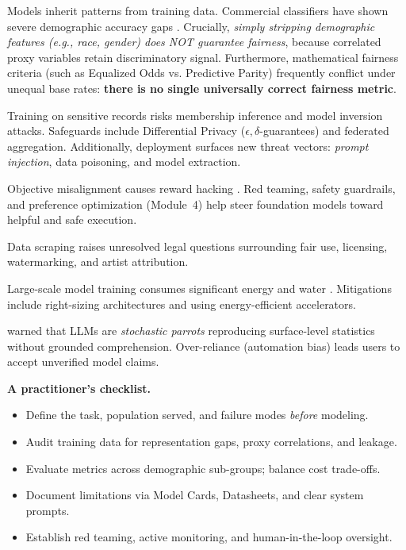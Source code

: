 \documentclass[11pt,a4paper]{article}
\begin{document}
	\begin{ethicsbox}
		\begin{description}[font=\sffamily\bfseries]
			\item[Bias \& Fairness.] Models inherit patterns from training data. Commercial classifiers have shown severe demographic accuracy gaps \parencite{buolamwini2018}. Crucially, \emph{simply stripping demographic features (e.g., race, gender) does NOT guarantee fairness}, because correlated proxy variables retain discriminatory signal. Furthermore, mathematical fairness criteria (such as Equalized Odds vs. Predictive Parity) frequently conflict under unequal base rates: \textbf{there is no single universally correct fairness metric}.
			\item[Privacy \& Security.] Training on sensitive records risks membership inference and model inversion attacks. Safeguards include Differential Privacy ($\epsilon, \delta$-guarantees) and federated aggregation. Additionally, deployment surfaces new threat vectors: \emph{prompt injection}, data poisoning, and model extraction.
			\item[Alignment \& Harm Mitigation.] Objective misalignment causes reward hacking \parencite{amodei2016, christian2020}. Red teaming, safety guardrails, and preference optimization (Module~4) help steer foundation models toward helpful and safe execution.
			\item[Copyright \& Provenance.] Data scraping raises unresolved legal questions surrounding fair use, licensing, watermarking, and artist attribution.
			\item[Environment.] Large-scale model training consumes significant energy and water \parencite{strubell2019, patterson2021}. Mitigations include right-sizing architectures and using energy-efficient accelerators.
			\item[Automation Bias \& Grounding.] \textcite{bender2021} warned that LLMs are \emph{stochastic parrots} reproducing surface-level statistics without grounded comprehension. Over-reliance (automation bias) leads users to accept unverified model claims.
		\end{description}
	\end{ethicsbox}
	
	\textbf{A practitioner's checklist.}
	\begin{itemize}
		\item Define the task, population served, and failure modes \emph{before} modeling.
		\item Audit training data for representation gaps, proxy correlations, and leakage.
		\item Evaluate metrics across demographic sub-groups; balance cost trade-offs.
		\item Document limitations via Model Cards, Datasheets, and clear system prompts.
		\item Establish red teaming, active monitoring, and human-in-the-loop oversight.
	\end{itemize}
	
\end{document}
